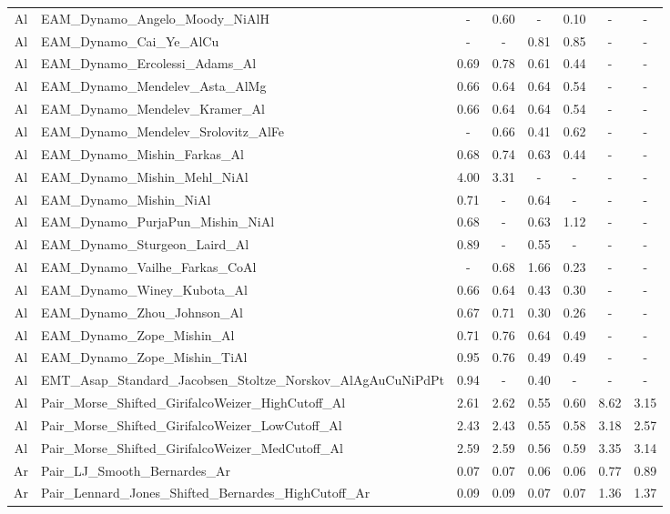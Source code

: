 \documentclass[%
 reprint,
 amsmath,amssymb,
 aps,
]{revtex4-1}
\begin{document}
\begin{longtable*}{@{\extracolsep{\fill}} c l c c c c c c}
 Al & EAM\_Dynamo\_Angelo\_Moody\_NiAlH & - & 0.60 & - & 0.10 & - & - \\
 Al & EAM\_Dynamo\_Cai\_Ye\_AlCu & - & - & 0.81 & 0.85 & - & - \\
 Al & EAM\_Dynamo\_Ercolessi\_Adams\_Al & 0.69 & 0.78 & 0.61 & 0.44 & - & - \\
 Al & EAM\_Dynamo\_Mendelev\_Asta\_AlMg & 0.66 & 0.64 & 0.64 & 0.54 & - & - \\
 Al & EAM\_Dynamo\_Mendelev\_Kramer\_Al & 0.66 & 0.64 & 0.64 & 0.54 & - & - \\
 Al & EAM\_Dynamo\_Mendelev\_Srolovitz\_AlFe & - & 0.66 & 0.41 & 0.62 & - & - \\
 Al & EAM\_Dynamo\_Mishin\_Farkas\_Al & 0.68 & 0.74 & 0.63 & 0.44 & - & - \\
 Al & EAM\_Dynamo\_Mishin\_Mehl\_NiAl & 4.00 & 3.31 & - & - & - & - \\
 Al & EAM\_Dynamo\_Mishin\_NiAl & 0.71 & - & 0.64 & - & - & - \\
 Al & EAM\_Dynamo\_PurjaPun\_Mishin\_NiAl & 0.68 & - & 0.63 & 1.12 & - & - \\
 Al & EAM\_Dynamo\_Sturgeon\_Laird\_Al & 0.89 & - & 0.55 & - & - & - \\
 Al & EAM\_Dynamo\_Vailhe\_Farkas\_CoAl & - & 0.68 & 1.66 & 0.23 & - & - \\
 Al & EAM\_Dynamo\_Winey\_Kubota\_Al & 0.66 & 0.64 & 0.43 & 0.30 & - & - \\
 Al & EAM\_Dynamo\_Zhou\_Johnson\_Al & 0.67 & 0.71 & 0.30 & 0.26 & - & - \\
 Al & EAM\_Dynamo\_Zope\_Mishin\_Al & 0.71 & 0.76 & 0.64 & 0.49 & - & - \\
 Al & EAM\_Dynamo\_Zope\_Mishin\_TiAl & 0.95 & 0.76 & 0.49 & 0.49 & - & - \\
 Al & EMT\_Asap\_Standard\_Jacobsen\_Stoltze\_Norskov\_AlAgAuCuNiPdPt & 0.94 & - & 0.40 & - & - & - \\
 Al & Pair\_Morse\_Shifted\_GirifalcoWeizer\_HighCutoff\_Al & 2.61 & 2.62 & 0.55 & 0.60 & 8.62 & 3.15 \\
 Al & Pair\_Morse\_Shifted\_GirifalcoWeizer\_LowCutoff\_Al & 2.43 & 2.43 & 0.55 & 0.58 & 3.18 & 2.57 \\
 Al & Pair\_Morse\_Shifted\_GirifalcoWeizer\_MedCutoff\_Al & 2.59 & 2.59 & 0.56 & 0.59 & 3.35 & 3.14 \\
 Ar & Pair\_LJ\_Smooth\_Bernardes\_Ar & 0.07 & 0.07 & 0.06 & 0.06 & 0.77 & 0.89 \\
 Ar & Pair\_Lennard\_Jones\_Shifted\_Bernardes\_HighCutoff\_Ar & 0.09 & 0.09 & 0.07 & 0.07 & 1.36 & 1.37 \\

\end{longtable*}
\end{document}
